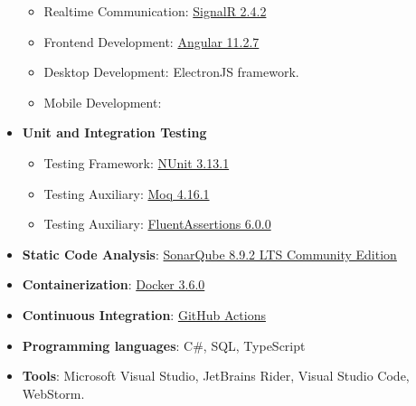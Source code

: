 \begin{itemize}
\begin{itemize}
        \item Realtime Communication: \href{https://www.nuget.org/packages/Microsoft.AspNet.SignalR/}{SignalR 2.4.2}
        \item Frontend Development: \href{https://angular.io/guide/setup-local}{Angular 11.2.7}
        \item Desktop Development: ElectronJS framework.
        \item Mobile Development:
    \end{itemize}
    \item \textbf{Unit and Integration Testing}
    \begin{itemize}
        \item Testing Framework: \href{https://www.nuget.org/packages/NUnit/}{NUnit 3.13.1}
        \item Testing Auxiliary: \href{https://www.nuget.org/packages/Moq/}{Moq 4.16.1}
        \item Testing Auxiliary: \href{https://www.nuget.org/packages/FluentAssertions}{FluentAssertions 6.0.0}
    \end{itemize}
    \item \textbf{Static Code Analysis}: \href{https://www.sonarqube.org/downloads/}{SonarQube 8.9.2 LTS Community Edition}
    \item \textbf{Containerization}: \href{https://docs.docker.com/desktop/windows/install/}{Docker 3.6.0}
    \item \textbf{Continuous Integration}: \href{https://docs.github.com/en/actions}{GitHub Actions}
    \item \textbf{Programming languages}: C\#, SQL, TypeScript
    \item \textbf{Tools}: Microsoft Visual Studio, JetBrains Rider, Visual Studio Code, WebStorm.
\end{itemize}